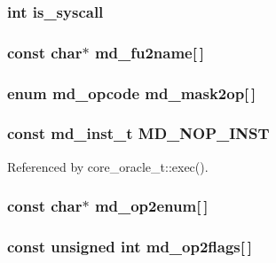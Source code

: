 \subsubsection[{is\_\-syscall}]{\setlength{\rightskip}{0pt plus 5cm}int {\bf is\_\-syscall}}\label{machine_8h_190cf67acd94a3907537ce7d422572d5}


\subsubsection[{md\_\-fu2name}]{\setlength{\rightskip}{0pt plus 5cm}const char$\ast$ {\bf md\_\-fu2name}[$\,$]}\label{machine_8h_b11573b466a921e8218f4606dc9785fd}


\subsubsection[{md\_\-mask2op}]{\setlength{\rightskip}{0pt plus 5cm}enum {\bf md\_\-opcode} {\bf md\_\-mask2op}[$\,$]}\label{machine_8h_37468a9eabf8ffb9ab36aeba214ab889}


\subsubsection[{MD\_\-NOP\_\-INST}]{\setlength{\rightskip}{0pt plus 5cm}const {\bf md\_\-inst\_\-t} {\bf MD\_\-NOP\_\-INST}}\label{machine_8h_0fffd32d95bb6273df749071509e6476}




Referenced by core\_\-oracle\_\-t::exec().
\subsubsection[{md\_\-op2enum}]{\setlength{\rightskip}{0pt plus 5cm}const char$\ast$ {\bf md\_\-op2enum}[$\,$]}\label{machine_8h_4b309227b94c2871cdf42823ca9897dd}


\subsubsection[{md\_\-op2flags}]{\setlength{\rightskip}{0pt plus 5cm}const unsigned int {\bf md\_\-op2flags}[$\,$]}\label{machine_8h_0f9bc5db3570204239cce1fd0b2d0b24}


